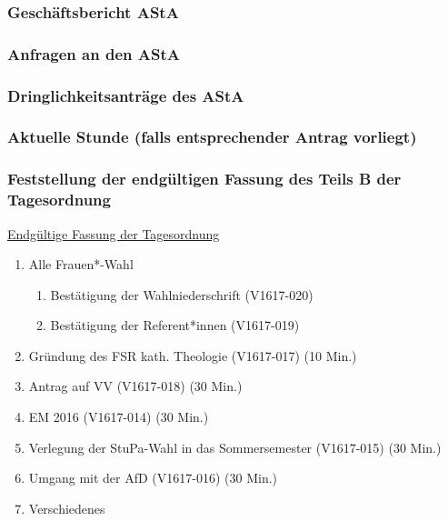 \documentclass[ngerman,headheight=70pt]{scrartcl}
\begin{document}
    \subsubsection{Geschäftsbericht AStA}

    \subsubsection{Anfragen an den AStA}

    \subsubsection{Dringlichkeitsanträge des AStA}

    \subsubsection{Aktuelle Stunde (falls entsprechender Antrag vorliegt)}

    \subsubsection{Feststellung der endgültigen Fassung des Teils B der Tagesordnung}

    \underline{Endgültige Fassung der Tagesordnung}
    \begin{enumerate}[label={\textbf{Top \theenumi}},leftmargin=*]
        \item Alle Frauen*-Wahl
            \begin{enumerate}
                \item Bestätigung der Wahlniederschrift (V1617-020)
                \item Bestätigung der Referent*innen (V1617-019)
            \end{enumerate}
        \item Gründung des FSR kath. Theologie (V1617-017) (10 Min.)
        \item Antrag auf VV (V1617-018) (30 Min.)
        \item EM 2016 (V1617-014) (30 Min.)
        \item Verlegung der StuPa-Wahl in das Sommersemester (V1617-015) (30 Min.)
        \item Umgang mit der AfD (V1617-016) (30 Min.)
        \item Verschiedenes
    \end{enumerate}
\end{document}
